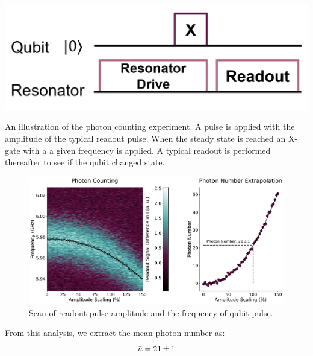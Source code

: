 \begin{marginfigure}[-4 cm]
    \centering
    \includegraphics{Figs/circuits/photon_counting.png}
    \caption{An illustration of the photon counting experiment. A pulse is applied with the amplitude of the typical readout pulse. When the steady state is reached an X-gate with a a given frequency is applied. A typical readout is performed thereafter to see if the qubit changed state.}
    \label{fig:photon_counting_circuit}
\end{marginfigure}

\begin{figure}[h]
    \centering
    \includegraphics[width = \linewidth]{Calibrations/Figures/photon_number.pdf}
    \caption{Scan of readout-pulse-amplitude and the frequency of qubit-pulse.}
    \label{fig:calibration_photon_counting_scan}
\end{figure}

From this analysis, we extract the mean photon number as:
\begin{equation}
    \Bar{n} = 21 \pm 1
\end{equation}

